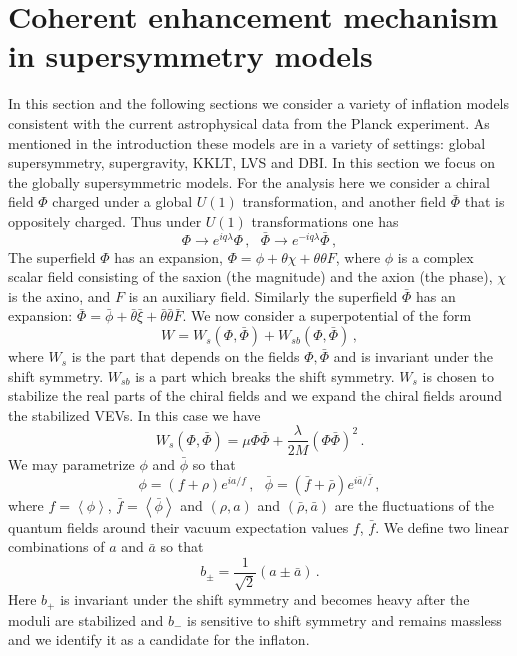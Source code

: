 \documentclass[12pt]{article}
\begin{document}
\section{Coherent enhancement mechanism in supersymmetry models \label{sec:Supersymmetry}}
In this section and the following sections we consider a variety of inflation models consistent with the current astrophysical data from the Planck experiment.
As mentioned in the introduction these models are in a variety of settings: global supersymmetry, supergravity, KKLT, LVS and DBI.
In this section we focus on the globally supersymmetric models.
For the analysis here we consider a chiral field $\Phi$ charged under a global $U\left(1\right)$ transformation, and another field $\bar\Phi$ that is oppositely charged.
Thus under $U\left(1\right)$ transformations one has
\begin{equation}
  \Phi \to e^{i q \lambda} \Phi\,,
  ~~~ \bar\Phi \to e^{-i q \lambda} \bar\Phi\,,
\end{equation}
The superfield $\Phi$ has an expansion, $\Phi = \phi + \theta \chi + \theta \theta F$, where $\phi$ is a complex scalar field consisting of the saxion (the magnitude) and the axion (the phase), $\chi$ is the axino, and $F$ is an auxiliary field.
Similarly the superfield $\bar\Phi$ has an expansion: $\bar\Phi = \bar\phi + \bar\theta \bar\xi + \bar\theta \bar\theta \bar F$.
We now consider a superpotential of the form
\begin{equation} \label{eq:supersymmetry:W}
  W = W_s\left(\Phi, \bar\Phi\right) + W_{sb}\left(\Phi, \bar\Phi\right)\,,
\end{equation}
where $W_s$ is the part that depends on the fields $\Phi, \bar\Phi$ and is invariant under the shift symmetry.
$W_{sb}$ is a part which breaks the shift symmetry.
$W_s$ is chosen to stabilize the real parts of the chiral fields and we expand the chiral fields around the stabilized VEVs.
In this case we have
\begin{equation}
  W_s\left(\Phi, \bar\Phi\right) =
    \mu \Phi \bar\Phi + \frac{\lambda}{2 M} \left(\Phi \bar\Phi\right)^2\,.
\end{equation}
We may parametrize $\phi$ and $\bar\phi$ so that
\begin{equation}
  \phi = \left(f + \rho\right) e^{i a / f}\,,
  ~~~ \bar\phi = \left(\bar f + \bar\rho\right) e^{i \bar a / \bar f}\,,
\end{equation}
where $f = \left<\phi\right>$, $\bar f = \left<\bar\phi\right>$ and $\left(\rho, a\right)$ and $\left(\bar\rho, \bar a\right)$ are the fluctuations of the quantum fields around their vacuum expectation values $f$, $\bar f$.
We define two linear combinations of $a$ and $\bar a$ so that
\begin{equation} \label{eq:b+-}
  b_{\pm}= \frac{1}{\sqrt 2} \left(a \pm \bar a\right)\,.
\end{equation}
Here $b_+$ is invariant under the shift symmetry and becomes heavy after the moduli are stabilized and $b_-$ is sensitive to shift symmetry and remains massless and we identify it as a candidate for the inflaton.
\end{document}
